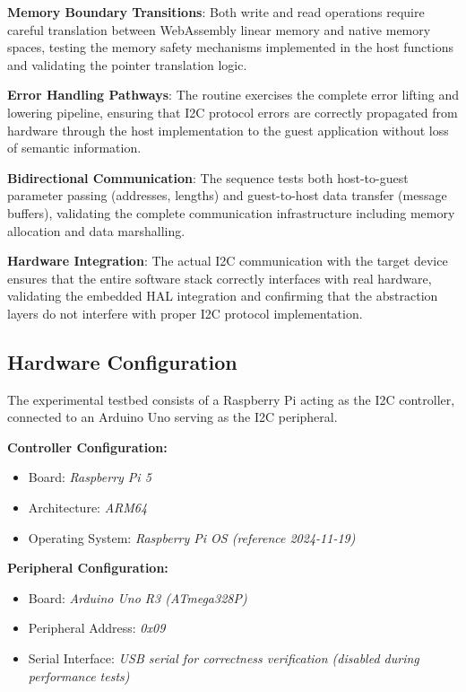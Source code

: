 \textbf{Memory Boundary Transitions}: Both write and read operations require careful translation between WebAssembly linear memory and native memory spaces, testing the memory safety mechanisms implemented in the host functions and validating the pointer translation logic.

\textbf{Error Handling Pathways}: The routine exercises the complete error lifting and lowering pipeline, ensuring that I2C protocol errors are correctly propagated from hardware through the host implementation to the guest application without loss of semantic information.

\textbf{Bidirectional Communication}: The sequence tests both host-to-guest parameter passing (addresses, lengths) and guest-to-host data transfer (message buffers), validating the complete communication infrastructure including memory allocation and data marshalling.

\textbf{Hardware Integration}: The actual I2C communication with the target device ensures that the entire software stack correctly interfaces with real hardware, validating the embedded HAL integration and confirming that the abstraction layers do not interfere with proper I2C protocol implementation.

\subsection{Hardware Configuration}
\label{subsec:eval-setup-hw}

The experimental testbed consists of a Raspberry Pi acting as the I2C controller, connected to an Arduino Uno serving as the I2C peripheral.

\textbf{Controller Configuration:}
\begin{itemize}
    \item Board: \textit{Raspberry Pi 5}
    \item Architecture: \textit{ARM64} %
    \item Operating System: \textit{Raspberry Pi OS (reference 2024-11-19)}~\cite{pi_os}
\end{itemize}

\textbf{Peripheral Configuration:}
\begin{itemize}
    \item Board: \textit{Arduino Uno R3 (ATmega328P)}
    \item Peripheral Address: \textit{0x09}
    \item Serial Interface: \textit{USB serial for correctness verification (disabled during performance tests)}
\end{itemize}

